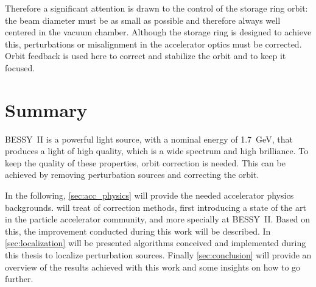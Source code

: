 Therefore a significant attention is drawn to the control of the storage ring orbit: the beam diameter must be as small as possible and therefore always well centered in the vacuum chamber. Although the storage ring is designed to achieve this, perturbations or misalignment in the accelerator optics must be corrected. Orbit feedback is used here to correct and stabilize the orbit and to keep it focused.

\section{Summary}
BESSY~II is a powerful light source, with a nominal energy of \SI{1.7}{\giga\electronvolt}, that produces a light of high quality, which is a wide spectrum and high brilliance. To keep the quality of these properties, orbit correction is needed. This can be achieved by removing perturbation sources and correcting the orbit.

In the following, \cref{sec:acc_physics} will provide the needed accelerator physics backgrounds.  will treat of correction methods, first introducing a state of the art in the particle accelerator community, and more specially at BESSY~II. Based on this, the improvement conducted during this work will be described. In \cref{sec:localization} will be presented algorithms conceived and implemented during this thesis to localize perturbation sources. Finally \cref{sec:conclusion} will provide an overview of the results achieved with this work and some insights on how to go further.
